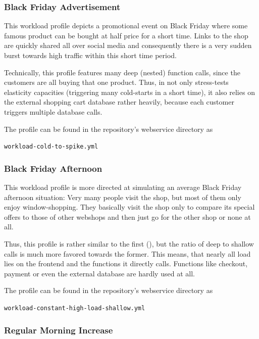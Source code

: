 \documentclass[../main.tex]{subfiles}
\begin{document}
\subsubsection{Black Friday Advertisement}%
\label{ssub:webshopProfileBlackFridayAds}

This workload profile depicts a promotional event on Black Friday where some famous product can be bought at half price for a short time.
Links to the shop are quickly shared all over social media and consequently there is a very sudden burst towards high traffic
within this short time period.

Technically, this profile features many deep (nested) function calls, since the customers are all buying that one product.
Thus, in not only stress-tests elasticity capacities (triggering many cold-starts in a short time),
it also relies on the external shopping cart database rather heavily, because each customer triggers multiple database calls.

The profile can be found in the repository's webservice directory as 
\begin{tcolorbox}
\quad\texttt{workload-cold-to-spike.yml}
\end{tcolorbox}

\subsubsection{Black Friday Afternoon}%
\label{ssub:webshopProfileBlackFridayDaytime}

This workload profile is more directed at simulating an average Black Friday afternoon situation:
Very many people visit the shop, but most of them only enjoy window-shopping. 
They basically visit the shop only to compare its special offers to those of other webshops
and then just go for the other shop or none at all.

Thus, this profile is rather similar to the first (),
but the ratio of deep to shallow calls is much more favored towards the former.
This means, that nearly all load lies on the frontend and the functions it directly calls.
Functions like checkout, payment or even the external database are hardly used at all.

The profile can be found in the repository's webservice directory as 
\begin{tcolorbox}
\quad\texttt{workload-constant-high-load-shallow.yml}
\end{tcolorbox}

\subsubsection{Regular Morning Increase}%
\label{ssub:webshopProfileRegularMorning}
\end{document}
